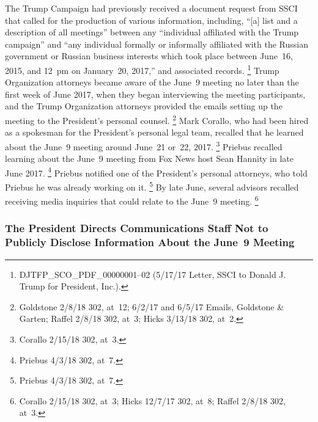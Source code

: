 The Trump Campaign had previously received a document request from SSCI that called for the production of various information, including, ``[a] list and a description of all meetings'' between any ``individual affiliated with the Trump campaign'' and ``any individual formally or informally affiliated with the Russian government or Russian business interests which took place between June~16, 2015, and 12~pm on January~20, 2017,'' and associated records.%
\footnote{DJTFP\_SCO\_PDF\_00000001--02 (5/17/17 Letter, SSCI to Donald J. Trump for President, Inc.).}
Trump Organization attorneys became aware of the June~9 meeting no later than the first week of June 2017, when they began interviewing the meeting participants, and the Trump Organization attorneys provided the emails setting up the meeting to the President's personal counsel.%
\footnote{Goldstone 2/8/18 302, at~12;
6/2/17 and 6/5/17 Emails, Goldstone \& Garten;
Raffel 2/8/18 302, at~3;
Hicks 3/13/18 302, at~2.}
Mark Corallo, who had been hired as a spokesman for the President's personal legal team, recalled that he learned about the June~9 meeting around June~21 or~22, 2017.%
\footnote{Corallo 2/15/18 302, at~3.}
Priebus recalled learning about the June~9 meeting from Fox News host Sean Hannity in late June 2017.%
\footnote{Priebus 4/3/18 302, at~7.}
Priebus notified one of the President's personal attorneys, who told Priebus he was already working on it.%
\footnote{Priebus 4/3/18 302, at~7.}
By late June, several advisors recalled receiving media inquiries that could relate to the June~9 meeting.%
\footnote{Corallo 2/15/18 302, at~3;
Hicks 12/7/17 302, at~8;
Raffel 2/8/18 302, at~3.}

\subsubsection{The President Directs Communications Staff Not to Publicly Disclose Information About the June~9 Meeting}

